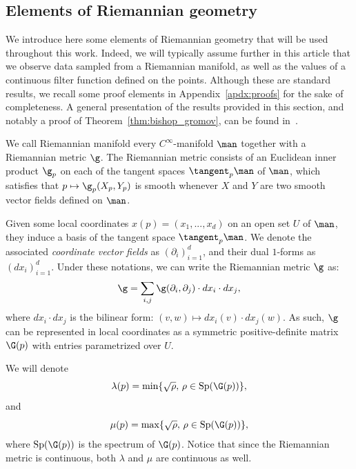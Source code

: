 \subsection{Elements of Riemannian geometry}
\label{sec:elemRiem}
 
We introduce here some elements of Riemannian geometry that will be used throughout this work. Indeed, we will typically assume further in this article that we observe data sampled from a Riemannian manifold, as well as the values of a continuous filter function defined on the points. Although these are standard results, we recall some proof elements in Appendix~\ref{apdx:proofs} for the sake of completeness. A general presentation of the results provided in this section, and notably a proof of Theorem~\ref{thm:bishop_gromov}, can be found in~\cite{petersen2006riemannian}.

We call Riemannian manifold every $C^{\infty}$-manifold $\man$ together with a Riemannian metric $\g$. The Riemannian metric consists of an Euclidean inner product $\g_p$ on each of the tangent spaces $\tangent_p\man$ of $\man$, which satisfies that $p\mapsto\g_p(X_p,Y_p)$ is smooth whenever $X$ and $Y$ are two smooth vector fields defined on $\man$. 

Given some local coordinates $x(p)=(x_1,...,x_d)$ on an open set $U$ of $\man$, 
they induce a basis of the tangent space $\tangent_p\man$. %
We denote the associated {\it coordinate vector fields} as $(\partial_i)_{i=1}^d$, and their dual $1$-forms as $(dx_i)_{i=1}^d$.
Under these notations, we can write the Riemannian metric $\g$ as:
$$\g=\sum_{i,j}\g(\partial_i,\partial_j)\cdot dx_i\cdot dx_j,$$
where $dx_i\cdot dx_j$ is the bilinear form: $(v,w)\mapsto dx_i(v)\cdot dx_j(w).$
As such, $\g$ can be represented in local coordinates as a symmetric positive-definite matrix $\G(p)$ with entries parametrized over $U$.

We will denote
$$\lambda(p)=\min\{\sqrt{\rho},\,\rho\in\mathrm{Sp}(\G(p))\},$$
and
$$\mu(p)=\max\{\sqrt{\rho},\,\rho\in\mathrm{Sp}(\G(p))\},$$
where $\mathrm{Sp}(\G(p))$ is the spectrum of $\G(p)$. Notice that since the Riemannian metric is continuous, both $\lambda$ and $\mu$ are continuous as well.

